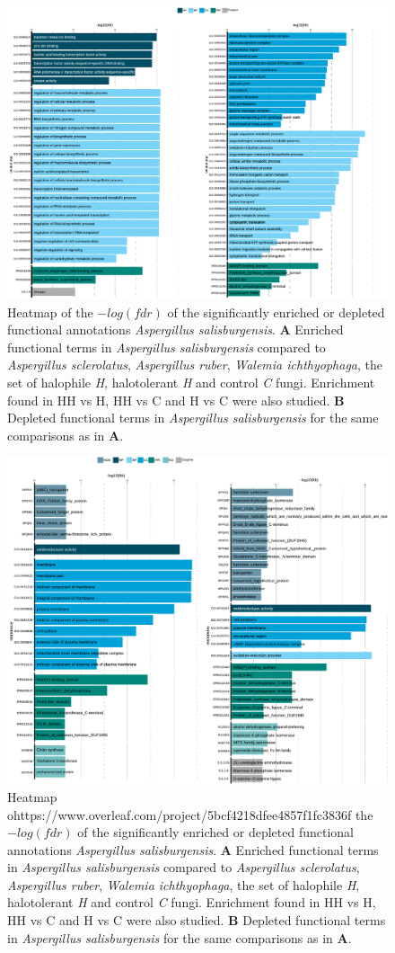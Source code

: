 \documentclass[jof,article,submit,moreauthors,pdftex,10pt,a4paper]{Definitions/mdpi}
\newcommand{\aspRub}{\textit{Aspergillus ruber}}
\newcommand{\walIch}{\textit{Walemia ichthyophaga}}
\newcommand{\phiSp}{\textit{Aspergillus salisburgensis}}
\newcommand{\phiScl}{\textit{Aspergillus sclerolatus}}
\begin{document}
\begin{figure}
    \centering
    \includegraphics[width=0.8\linewidth]{phiScl_SALT_summary.pdf}
    \caption{\label{fig:phiSclUpDown} Heatmap of the $-log(fdr)$ of the significantly enriched or depleted functional annotations {\phiSp}. 
    \textbf{A} Enriched functional terms in {\phiSp} compared to {\phiScl}, {\aspRub}, {\walIch}, the set of halophile \textit{H}, halotolerant \textit{H} and control \textit{C} fungi. Enrichment found in HH vs H, HH vs C and H vs C were also studied. \textbf{B} Depleted functional terms in {\phiSp} for the same comparisons as in \textbf{A}.}
\end{figure}

\begin{figure}
    \centering
    \includegraphics[width=0.8\linewidth]{phiSp_SALT_summary.pdf}
    \caption{\label{fig:phiSclUpDown} Heatmap ohttps://www.overleaf.com/project/5bcf4218dfee4857f1fc3836f the $-log(fdr)$ of the significantly enriched or depleted functional annotations {\phiSp}. 
    \textbf{A} Enriched functional terms in {\phiSp} compared to {\phiScl}, {\aspRub}, {\walIch}, the set of halophile \textit{H}, halotolerant \textit{H} and control \textit{C} fungi. Enrichment found in HH vs H, HH vs C and H vs C were also studied. \textbf{B} Depleted functional terms in {\phiSp} for the same comparisons as in \textbf{A}.}
\end{figure}
\end{document}
